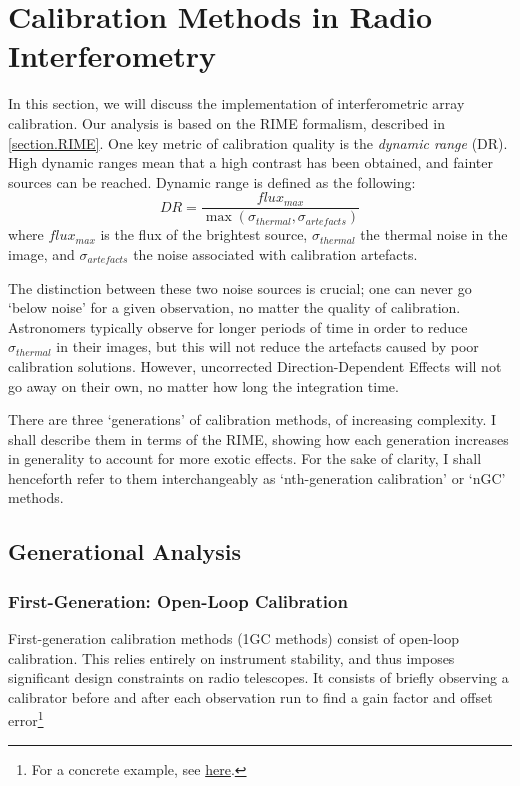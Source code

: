 
\section{Calibration Methods in Radio Interferometry}\label{section.calibration}
\pg
In this section, we will discuss the implementation of interferometric array calibration. Our analysis is based on the RIME formalism, described in \cref{section.RIME}. One key metric of calibration quality is the \emph{dynamic range} (DR). High dynamic ranges mean that a high contrast has been obtained, and fainter sources can be reached. Dynamic range is defined as the following:
\begin{equation}\label{eq.DR}
DR = \frac{flux_{max}}{\max(\sigma_{thermal},\sigma_{artefacts})}
\end{equation}
where $flux_{max}$ is the flux of the brightest source, $\sigma_{thermal}$ the thermal noise in the image, and $\sigma_{artefacts}$ the noise associated with calibration artefacts.

\pg
The distinction between these two noise sources is crucial; one can never go `below noise' for a given observation, no matter the quality of calibration. Astronomers typically observe for longer periods of time in order to reduce $\sigma_{thermal}$ in their images, but this will not reduce the artefacts caused by poor calibration solutions. However, uncorrected Direction-Dependent Effects will not go away on their own, no matter how long the integration time.

\pg
There are three `generations' of calibration methods, of increasing complexity. I shall describe them in terms of the RIME, showing how each generation increases in generality to account for more exotic effects. For the sake of clarity, I shall henceforth refer to them interchangeably as `nth-generation calibration' or `nGC' methods.

\subsection{Generational Analysis}

\subsubsection{First-Generation: Open-Loop Calibration}\label{section.calibration.1gc}

\pg
First-generation calibration methods (1GC methods) consist of open-loop calibration. This relies entirely on instrument stability, and thus imposes significant design constraints on radio telescopes. It consists of briefly observing a calibrator before and after each observation run to find a gain factor and offset error\footnote{For a concrete example, see \href{http://www.analog.com/en/analog-dialogue/articles/open-loop-calibration-techniques.html}{here}.}


